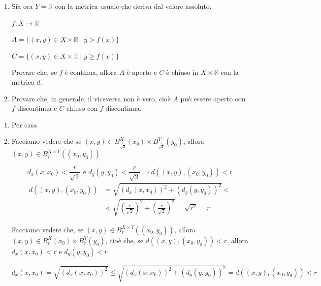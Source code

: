 \begin{exbar}
\begin{example}
\begin{enumerate}
		\item Sia ora $Y = \mathbb{R}$ con la metrica usuale che deriva dal valore assoluto.
		
		$f:X \rightarrow \mathbb{R}$
		
		$A = \{ (x,y) \in X \times \mathbb{R} \; \big| \; y > f(x) \}$
		
		$C = \{ (x,y) \in X \times \mathbb{R} \; \big| \; y \geq f(x) \}$
		
		Provare che, se $f $ è continua, allora $A$ è aperto e $C$ è chiuso in $X \times \mathbb{R}$ con la metrica $d$.
		
		\item Provare che, in generale, il viceversa non è vero, cioè $A$ può essere aperto con $f$ discontinua e $C$ chiuso con $f$ discontinua.	
	\end{enumerate}
	
	\hline
	
	\begin{enumerate}
		\item Per casa
		
		\item Facciamo vedere che se $(x,y) \in B_{\frac{r}{\sqrt{2}}}^{X}(x_0) \times B_{\frac{r}{\sqrt{2}}}^{Y}(y_0)$, allora $(x, y) \in B_{r}^{X \times Y} ((x_0, y_0))$
		
		\begin{equation*}
			d_x(x, x_0) < \frac{r}{\sqrt{2}} \text{  e  } d_y(y, y_0) < \frac{r}{\sqrt{2}}
			\Rightarrow d((x,y), (x_0,y_0)) < r
		\end{equation*}
		\begin{align*}
			d((x,y),(x_0,y_0)) 
			&= \sqrt{(d_x(x, x_0))^2 + (d_y(y,y_0))^2} <
			\\
			&< \sqrt{\left( \frac{r}{\sqrt{2}} \right)^2+\left( \frac{r}{\sqrt{2}} \right)^2} = \sqrt{r^2} = r
		\end{align*}

		Facciamo vedere che, se $(x,y) \in B_{r}^{X \times Y}((x_0, y_0))$, allora $(x,y) \in B_{r}^{X} (x_0) \times B_{r}^{Y} (y_0)$, cioè che, se $d((x,y), (x_0,y_0)) < r$, allora $d_x(x, x_0) < r$ e $d_y(y, y_0) < r$
		
		\begin{equation*}
			d_x (x, x_0)= \sqrt{(d_x (x, x_0))^2} \leq \sqrt{(d_x (x, x_0))^2 + (d_y (y, y_0))^2} = d((x,y), (x_0,y_0)) < r
		\end{equation*}
	

\end{enumerate}
\end{example}
\end{exbar}
